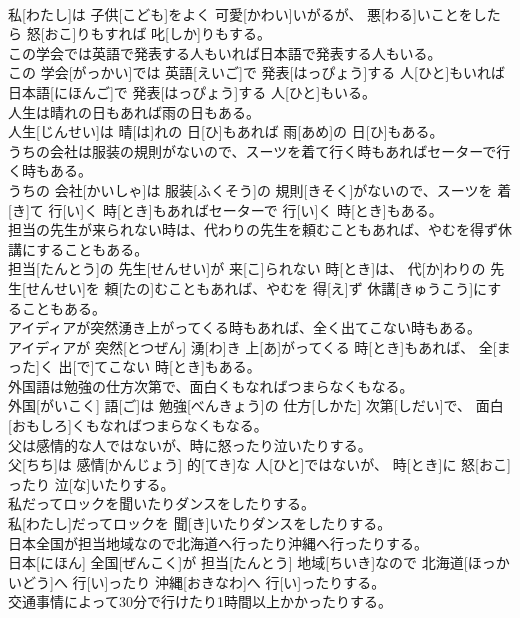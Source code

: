 \documentclass[8pt]{extreport}
\begin{document}
\begin{CJK}{UTF8}{min}
\\	私[わたし]は 子供[こども]をよく 可愛[かわい]いがるが、 悪[わる]いことをしたら 怒[おこ]りもすれば 叱[しか]りもする。
\\	この学会では英語で発表する人もいれば日本語で発表する人もいる。	
\\	この 学会[がっかい]では 英語[えいご]で 発表[はっぴょう]する 人[ひと]もいれば 日本語[にほんご]で 発表[はっぴょう]する 人[ひと]もいる。
\\	人生は晴れの日もあれば雨の日もある。	
\\	人生[じんせい]は 晴[は]れの 日[ひ]もあれば 雨[あめ]の 日[ひ]もある。
\\	うちの会社は服装の規則がないので、スーツを着て行く時もあればセーターで行く時もある。	
\\	うちの 会社[かいしゃ]は 服装[ふくそう]の 規則[きそく]がないので、スーツを 着[き]て 行[い]く 時[とき]もあればセーターで 行[い]く 時[とき]もある。
\\	担当の先生が来られない時は、代わりの先生を頼むこともあれば、やむを得ず休講にすることもある。	
\\	担当[たんとう]の 先生[せんせい]が 来[こ]られない 時[とき]は、 代[か]わりの 先生[せんせい]を 頼[たの]むこともあれば、やむを 得[え]ず 休講[きゅうこう]にすることもある。
\\	アイディアが突然湧き上がってくる時もあれば、全く出てこない時もある。	
\\	アイディアが 突然[とつぜん] 湧[わ]き 上[あ]がってくる 時[とき]もあれば、 全[まった]く 出[で]てこない 時[とき]もある。
\\	外国語は勉強の仕方次第で、面白くもなればつまらなくもなる。	
\\	外国[がいこく] 語[ご]は 勉強[べんきょう]の 仕方[しかた] 次第[しだい]で、 面白[おもしろ]くもなればつまらなくもなる。
\\	父は感情的な人ではないが、時に怒ったり泣いたりする。	
\\	父[ちち]は 感情[かんじょう] 的[てき]な 人[ひと]ではないが、 時[とき]に 怒[おこ]ったり 泣[な]いたりする。
\\	私だってロックを聞いたりダンスをしたりする。	
\\	私[わたし]だってロックを 聞[き]いたりダンスをしたりする。
\\	日本全国が担当地域なので北海道へ行ったり沖縄へ行ったりする。	
\\	日本[にほん] 全国[ぜんこく]が 担当[たんとう] 地域[ちいき]なので 北海道[ほっかいどう]へ 行[い]ったり 沖縄[おきなわ]へ 行[い]ったりする。
\\	交通事情によって30分で行けたり1時間以上かかったりする。	

\end{CJK}
\end{document}

